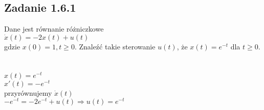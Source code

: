 \pagebreak
\subsection*{Zadanie 1.6.1} {\color{darkgray}
	Dane jest równanie różniczkowe\\
	$\dot{x}(t)=-2x(t)+u(t)$\\
	gdzie $x(0)=1, t\geqslant 0$. Znaleźć takie sterowanie $u(t)$, że $x(t)=e^{-t}$ dla $t \geqslant 0$.\\
}\lineh
\\\\
$x(t)=e^{-t}$\\
$x'(t)=-e^{-t}$\\
przyrównujemy $\dot{x}(t)$\\
$-e^{-t}=-2e^{-t}+u(t) \Rightarrow \boxed{u(t)=e^{-t}}$\\

\pagebreak
